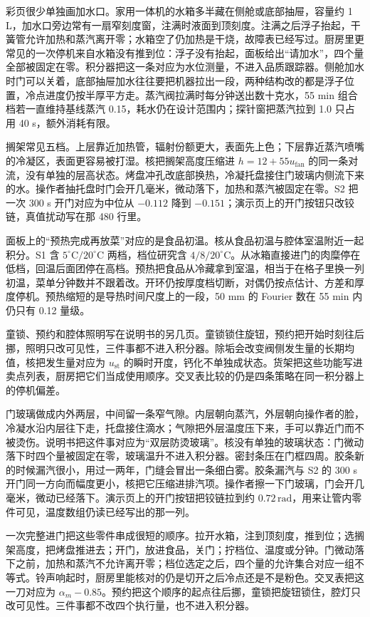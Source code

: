 彩页很少单独画加水口。家用一体机的水箱多半藏在侧舱或底部抽屉，容量约 1 L，加水口旁边常有一扇窄刻度窗，注满时液面到顶刻度。注满之后浮子抬起，干簧管允许加热和蒸汽离开零；水箱空了仍加热是干烧，故障表已经写过。厨房里更常见的一次停机来自水箱没有推到位：浮子没有抬起，面板给出“请加水”，四个量全部被固定在零。积分器把这一条对应为水位测量，不进入品质跟踪器。侧舱加水时门可以关着，底部抽屉加水往往要把机器拉出一段，两种结构改的都是浮子位置，冷点进度仍按半厚平方走。蒸汽阀拉满时每分钟送出数十克水，55 min 组合档若一直维持基线蒸汽 0.15，耗水仍在设计范围内；探针窗把蒸汽拉到 1.0 只占用 40 s，额外消耗有限。

搁架常见五档。上层靠近加热管，辐射份额更大，表面先上色；下层靠近蒸汽喷嘴的冷凝区，表面更容易被打湿。核把搁架高度压缩进 \(h=12+55u_{\mathrm{fan}}\) 的同一条对流，没有单独的层高状态。烤盘冲孔改底部换热，冷凝托盘接住门玻璃内侧流下来的水。操作者抽托盘时门会开几毫米，微动落下，加热和蒸汽被固定在零。S2 把一次 300 s 开门对应为中位从 \(-0.112\) 降到 \(-0.151\)；演示页上的开门按钮只改铰链，真值扰动写在那 480 行里。

面板上的“预热完成再放菜”对应的是食品初温。核从食品初温与腔体室温附近一起积分。S1 含 \(5^\circ\mathrm{C}/20^\circ\mathrm{C}\) 两档，档位研究含 \(4/8/20^\circ\mathrm{C}\)。从冰箱直接进门的肉糜停在低档，回温后面团停在高档。预热把食品从冷藏拿到室温，相当于在格子里换一列初温，菜单分钟数并不跟着改。开环仍按厚度档切断，对偶仍按点估计、方差和厚度停机。预热缩短的是导热时间尺度上的一段，50 mm 的 Fourier 数在 55 min 内仍只有 0.12 量级。

童锁、预约和腔体照明写在说明书的另几页。童锁锁住旋钮，预约把开始时刻往后挪，照明只改可见性，三件事都不进入积分器。除垢会改变阀侧发生量的长期均值，核把发生量对应为 \(u_{\mathrm{st}}\) 的瞬时开度，钙化不单独成状态。货架把这些功能写进卖点列表，厨房把它们当成使用顺序。交叉表比较的仍是四条策略在同一积分器上的停机偏差。

门玻璃做成内外两层，中间留一条窄气隙。内层朝向蒸汽，外层朝向操作者的脸，冷凝水沿内层往下走，托盘接住滴水；气隙把外层温度压下来，手可以靠近门而不被烫伤。说明书把这件事对应为“双层防烫玻璃”。核没有单独的玻璃状态：门微动落下时四个量被固定在零，玻璃温升不进入积分器。密封条压在门框四周。胶条新的时候漏汽很小，用过一两年，门缝会冒出一条细白雾。胶条漏汽与 S2 的 300 s 开门同一方向而幅度更小，核把它压缩进排汽项。操作者擦一下门玻璃，门会开几毫米，微动已经落下。演示页上的开门按钮把铰链拉到约 \(0.72\,\mathrm{rad}\)，用来让管内零件可见，温度数组仍读已经写出的那一列。

一次完整进门把这些零件串成很短的顺序。拉开水箱，注到顶刻度，推到位；选搁架高度，把烤盘推进去；开门，放进食品，关门；拧档位、温度或分钟。门微动落下之前，加热和蒸汽不允许离开零；档位选定之后，四个量的允许集合对应一组不等式。铃声响起时，厨房里能核对的仍是切开之后冷点还是不是粉色。交叉表把这一刀对应为 \(\alpha_m-0.85\)。预约把这个顺序的起点往后挪，童锁把旋钮锁住，腔灯只改可见性。三件事都不改四个执行量，也不进入积分器。
